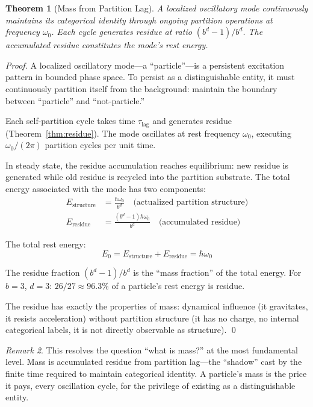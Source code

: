 \documentclass[twocolumn,10pt,a4paper]{article}
\newtheorem{theorem}{Theorem}[section]
\theoremstyle{definition}
\theoremstyle{remark}
\newtheorem{remark}[theorem]{Remark}
\newcommand{\Lag}{\tau_{\mathrm{lag}}}
\begin{document}
\begin{theorem}[Mass from Partition Lag]
\label{thm:mass-residue}
A localized oscillatory mode continuously maintains its categorical identity through ongoing partition operations at frequency $\omega_0$. Each cycle generates residue at ratio $(b^d - 1)/b^d$. The accumulated residue constitutes the mode's rest energy.
\end{theorem}

\begin{proof}
A localized oscillatory mode---a ``particle''---is a persistent excitation pattern in bounded phase space. To persist as a distinguishable entity, it must continuously partition itself from the background: maintain the boundary between ``particle'' and ``not-particle.''

Each self-partition cycle takes time $\Lag$ and generates residue (Theorem~\ref{thm:residue}). The mode oscillates at rest frequency $\omega_0$, executing $\omega_0/(2\pi)$ partition cycles per unit time.

In steady state, the residue accumulation reaches equilibrium: new residue is generated while old residue is recycled into the partition substrate. The total energy associated with the mode has two components:
\begin{align}
    E_{\text{structure}} &= \frac{\hbar\omega_0}{b^d} \quad \text{(actualized partition structure)} \\
    E_{\text{residue}} &= \frac{(b^d - 1)\hbar\omega_0}{b^d} \quad \text{(accumulated residue)}
\end{align}

The total rest energy:
\begin{equation}
    E_0 = E_{\text{structure}} + E_{\text{residue}} = \hbar\omega_0
\end{equation}

The residue fraction $(b^d - 1)/b^d$ is the ``mass fraction'' of the total energy. For $b = 3$, $d = 3$: $26/27 \approx 96.3\%$ of a particle's rest energy is residue.

The residue has exactly the properties of mass: dynamical influence (it gravitates, it resists acceleration) without partition structure (it has no charge, no internal categorical labels, it is not directly observable as structure). \qed
\end{proof}

\begin{remark}
This resolves the question ``what is mass?'' at the most fundamental level. Mass is accumulated residue from partition lag---the ``shadow'' cast by the finite time required to maintain categorical identity. A particle's mass is the price it pays, every oscillation cycle, for the privilege of existing as a distinguishable entity.
\end{remark}
\end{document}
